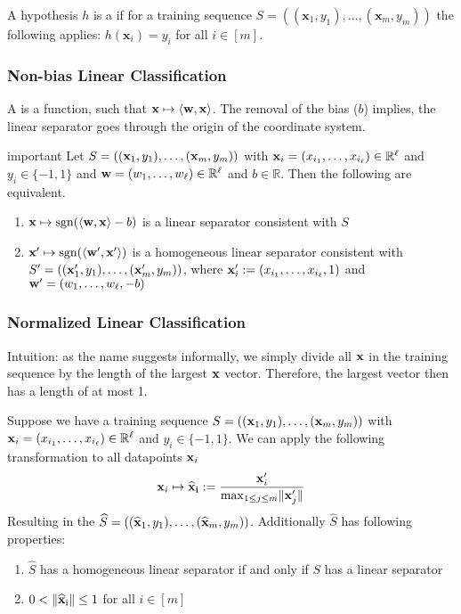 A hypothesis $h$ is a  if for a training sequence $S = ((\mathbf{x}_{1}, y_{1}), \ldots,(\mathbf{x}_{m}, y_{m}))$ the following applies: $h(\mathbf{x}_i) = y_i$ for all $i \in [m]$.

\subsubsection{Non-bias Linear Classification}
A  is a function, such that $\mathbf{x} \mapsto \langle\mathbf{w},\mathbf{x}\rangle$. The removal of the bias ($b$) implies, the linear separator goes through the origin of the coordinate system.	
\begin{theorem}{important}
Let $S=((\mathbf{x}_{1}, y_{1}), \ldots,(\mathbf{x}_{m}, y_{m}))$ with $\mathbf{x}_{i}=(x_{i _1}, \ldots, x_{i_\ell}) \in \mathbb{R}^\ell$ and $y_{i} \in\{-1,1\}$ and $\mathbf{w}=(w_{1}, \ldots, w_\ell) \in \mathbb{R}^\ell$ and $b \in \mathbb{R}$. Then the following are equivalent.
\begin{enumerate}
	\item $\mathbf{x} \mapsto \operatorname{sgn}(\langle\mathbf{w}, \mathbf{x}\rangle- b)$ is a linear separator consistent with $S$
	\item $\mathbf{x}^{\prime} \mapsto \operatorname{sgn}(\langle\mathbf{w}^\prime, \mathbf{x}^\prime\rangle)$ is a homogeneous linear separator consistent with $S^\prime=((\mathbf{x}_1^\prime, y_1), \ldots,(\mathbf{x}_m^\prime, y_m))$,  where $\mathbf{x}_i^\prime :=(x_{i_1}, \ldots, x_{i_\ell}, 1) $ and $\mathbf{w}^\prime=(w_{1}, \ldots, w_\ell,-b)$
\end{enumerate}
\end{theorem}
\subsubsection{Normalized Linear Classification}
Intuition: as the name suggests informally, we simply divide all $\mathbf{x}$ in the training sequence by the length of the largest $\mathbf{x}$ vector. Therefore, the largest vector then has a length of at most 1.

Suppose we have a training sequence $S=((\mathbf{x}_1, y_1), \ldots,(\mathbf{x}_{m}, y_{m}))$ with $\mathbf{x}_{i}=(x_{i_1}, \ldots, x_{i_\ell}) \in \mathbb{R}^\ell$ and $y_{i} \in\{-1,1\}$. We can apply the following transformation to all datapoints $\mathbf{x}_i$
\begin{equation}
\mathbf{x}_{i} \mapsto \widehat{\mathbf{x}}_{\mathbf{i}} :=\frac{\mathbf{x}_{i}^{\prime}}{\max _{1 \leq j \leq m}\lVert\mathbf{x}_{j}^{\prime}\rVert}
\end{equation}
Resulting in the  $\widehat{S}=((\widehat{\mathbf{x}}_{1}, y_{1}), \ldots,(\widehat{\mathbf{x}}_{m}, y_{m}))$. Additionally $\widehat{S}$ has following properties: 
\begin{enumerate}
	\item $\widehat{S}$ has a homogeneous linear separator if and only if $S$ has a linear separator
	\item $0 < \lVert\widehat{\mathbf{x}}_{\mathrm{i}}\rVert \leq 1 $ for all $ i \in [m]$
\end{enumerate}
